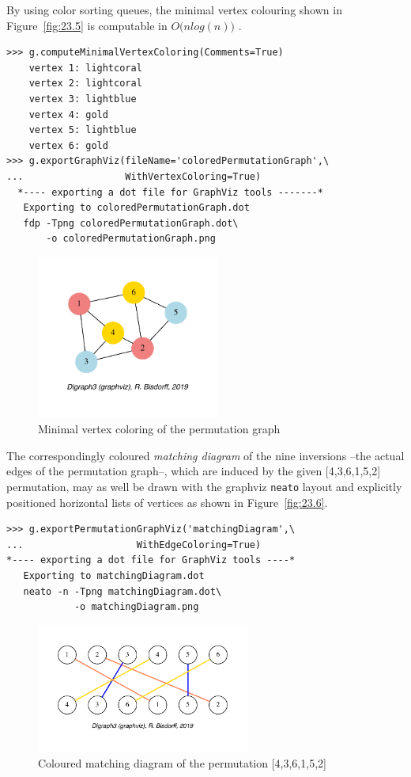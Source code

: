 By using color sorting queues, the minimal vertex colouring shown in Figure~\vref{fig:23.5} is computable in $O\big(n log(n)\big)$ \citep{GOL-2004}.
\begin{lstlisting}
>>> g.computeMinimalVertexColoring(Comments=True)
    vertex 1: lightcoral
    vertex 2: lightcoral
    vertex 3: lightblue
    vertex 4: gold
    vertex 5: lightblue
    vertex 6: gold
>>> g.exportGraphViz(fileName='coloredPermutationGraph',\
...                  WithVertexColoring=True)
  *---- exporting a dot file for GraphViz tools -------*
   Exporting to coloredPermutationGraph.dot
   fdp -Tpng coloredPermutationGraph.dot\
       -o coloredPermutationGraph.png
\end{lstlisting}
\begin{figure}[ht]
\sidecaption[t]
\includegraphics[width=6cm]{Figures/23-5-coloredPermutationGraph.pdf}
\caption{Minimal vertex coloring of the permutation graph} 
\label{fig:23.5}       %
\end{figure}

The correspondingly coloured \emph{matching diagram} of the nine inversions --the actual edges of the permutation graph--, which are induced by the given [4,3,6,1,5,2] permutation, may as well be drawn with the graphviz \texttt{neato} layout and explicitly positioned horizontal lists of vertices as shown in Figure~\vref{fig:23.6}.
\begin{lstlisting}
>>> g.exportPermutationGraphViz('matchingDiagram',\
...                    WithEdgeColoring=True)
*---- exporting a dot file for GraphViz tools ----*
   Exporting to matchingDiagram.dot
   neato -n -Tpng matchingDiagram.dot\
            -o matchingDiagram.png
\end{lstlisting}
\begin{figure}[ht]
\sidecaption[t]
\includegraphics[width=7cm]{Figures/23-6-perm_permutationGraph.pdf}
\caption{Coloured matching diagram of the permutation [4,3,6,1,5,2]} 
\label{fig:23.6}       %
\end{figure}

